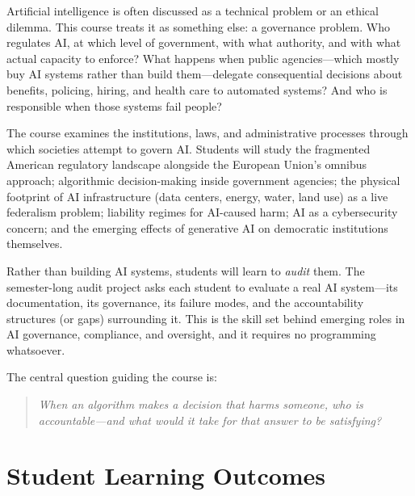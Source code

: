 \documentclass[12pt]{article}
\begin{document}
{\setlength{\parindent}{0pt}\setlength{\parskip}{0.6\baselineskip}%
Artificial intelligence is often discussed as a technical problem or an ethical dilemma. This course treats it as something else: a governance problem. Who regulates AI, at which level of government, with what authority, and with what actual capacity to enforce? What happens when public agencies---which mostly buy AI systems rather than build them---delegate consequential decisions about benefits, policing, hiring, and health care to automated systems? And who is responsible when those systems fail people?

The course examines the institutions, laws, and administrative processes through which societies attempt to govern AI. Students will study the fragmented American regulatory landscape alongside the European Union's omnibus approach; algorithmic decision-making inside government agencies; the physical footprint of AI infrastructure (data centers, energy, water, land use) as a live federalism problem; liability regimes for AI-caused harm; AI as a cybersecurity concern; and the emerging effects of generative AI on democratic institutions themselves.

Rather than building AI systems, students will learn to \emph{audit} them. The semester-long audit project asks each student to evaluate a real AI system---its documentation, its governance, its failure modes, and the accountability structures (or gaps) surrounding it. This is the skill set behind emerging roles in AI governance, compliance, and oversight, and it requires no programming whatsoever.

The central question guiding the course is:

\begin{quote}
\textit{When an algorithm makes a decision that harms someone, who is accountable---and what would it take for that answer to be satisfying?}
\end{quote}
}

\section*{Student Learning Outcomes}
\end{document}
